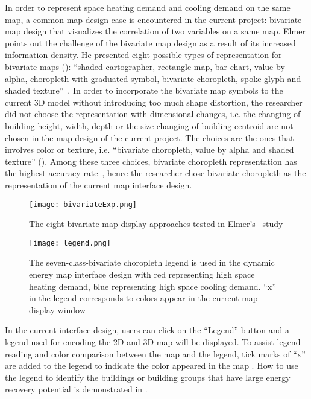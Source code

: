 In order to represent space heating demand and cooling demand on the
same map, a common map design case is encountered in the current
project: bivariate map design that visualizes the correlation of two
variables on a same map. Elmer points out the challenge of the
bivariate map design as a result of its increased information
density. He presented eight possible types of representation for
bivariate maps (): ``shaded cartographer,
rectangle map, bar chart, value by alpha, choropleth with graduated
symbol, bivariate choropleth, spoke glyph and shaded
texture''~\cite{Elmer2012}. In order to incorporate the bivariate map
symbols to the current 3D model without introducing too much shape
distortion, the researcher did not choose the representation with
dimensional changes, i.e. the changing of building height, width,
depth or the size changing of building centroid are not chosen in the
map design of the current project. The choices are the ones that
involves color or texture, i.e. ``bivariate choropleth, value by alpha
and shaded texture'' (). Among these three
choices, bivariate choropleth representation has the highest accuracy
rate~\cite{Elmer2012}, hence the researcher chose bivariate choropleth
as the representation of the current map interface design.

\begin{figure}[h!]
  \centering
  \texttt{[image: bivariateExp.png]}
  \caption[Bivariate Map Symbol Tested]{The eight bivariate map
    display approaches tested in Elmer's~\cite{Elmer2012} study}
  \label{fig:bivariateExp}
\end{figure}

\begin{figure}[h!]
  \centering
  \texttt{[image: legend.png]}
  \caption[Bivariate Map Legend]{The seven-class-bivariate choropleth
    legend is used in the dynamic energy map interface design with red
    representing high space heating demand, blue representing high
    space cooling demand. ``x'' in the legend corresponds to colors
    appear in the current map display window}
  \label{fig:legend}
\end{figure}

In the current interface design, users can click on the ``Legend''
button and a legend used for encoding the 2D and 3D map will be
displayed. To assist legend reading and color comparison between the
map and the legend, tick marks of ``x'' are added to the legend to
indicate the color appeared in the map . How to use
the legend to identify the buildings or building groups that have
large energy recovery potential is demonstrated in .

